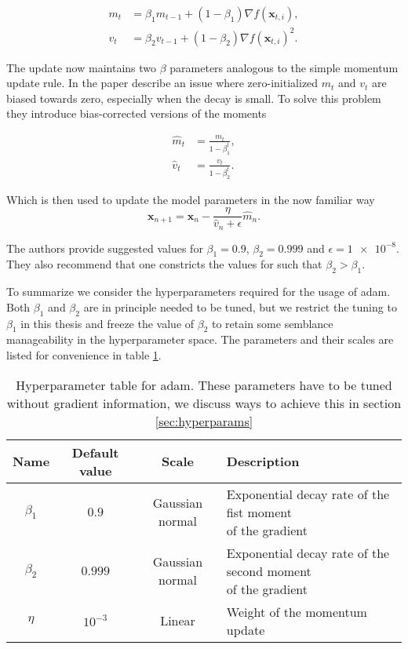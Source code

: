 \begin{align}
m_t &= \beta_1 m_{t-1} +(1-\beta_1)\nabla f(\mathbf{x}_{t, i}), \\
v_t &= \beta_2 v_{t-1} +(1-\beta_2)\nabla f(\mathbf{x}_{t, i})^2.
\end{align}

\noindent The update now maintains two $\beta$ parameters analogous to the simple momentum update rule. In the paper \citet{Kingma2015} describe an issue where zero-initialized $m_t$ and $v_t$ are biased towards zero, especially when the decay is small. To solve this problem they introduce bias-corrected versions of the moments 

\begin{align}
\hat{m}_t &= \frac{m_t}{1 - \beta_1^t}, \\
\hat{v}_t &= \frac{v_t}{1 - \beta_2^t}.
\end{align}

\noindent Which is then used to update the model parameters in the now familiar way
\begin{equation}\label{eq:adam}
\mathbf{x}_{n+1} = \mathbf{x}_{n} - \frac{\eta}{\hat{v}_n + \epsilon}\hat{m}_n.
\end{equation}

\noindent The authors provide suggested values for $\beta_1 =0.9 $, $\beta_2 =0.999$ and $\epsilon = \num{1e-8}$. They also recommend that one constricts the values for such that $\beta_2 > \beta_1$. 

To summarize we consider the hyperparameters required for the usage of adam. Both $\beta_1$ and $\beta_2$ are in principle needed to be tuned, but we restrict the tuning to $\beta_1$ in this thesis and freeze the value of $\beta_2$ to retain some semblance manageability in the hyperparameter space. The parameters and their scales are listed for convenience in table \ref{tab:adam}.

\begin{table}
\begin{tabular}{cccl}
\toprule
Name &Default value & Scale  & Description\\
\midrule
$\beta_1$  & $0.9$ & Gaussian normal & \makecell[l]{Exponential decay rate of the fist moment \\ of the gradient}\\
$\beta_2$  & $0.999$ & Gaussian normal & \makecell[l]{Exponential decay rate of the second moment \\ of the gradient}\\
$\eta$  & $10^{-3}$ & Linear & Weight of the momentum update \\
\bottomrule
\end{tabular}
\caption{Hyperparameter table for adam. These parameters have to be tuned without gradient information, we discuss ways to achieve this in section \ref{sec:hyperparams}}\label{tab:adam}
\end{table}



